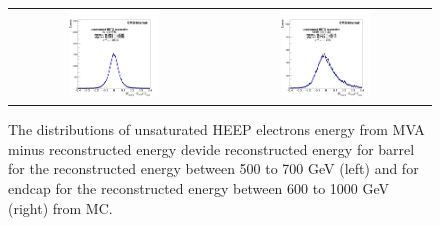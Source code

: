 \begin{figure}[bh]
  \begin{center}
    \begin{tabular}{cc}
      \includegraphics[width=0.45\textwidth]{chapters/Zprime/Saturation/images/ZToEE/ZToEE_B500-700_E600-1000/fit_BDTG_Barrel_Endcap_B_reg_nos.png} &
      \includegraphics[width=0.45\textwidth]{chapters/Zprime/Saturation/images/ZToEE/ZToEE_B500-700_E600-1000/fit_BDTG_Barrel_Endcap_E_reg_nos.png} \\
    \end{tabular}
    \caption{ The distributions of unsaturated HEEP electrons energy from MVA minus reconstructed energy devide reconstructed energy for barrel for the reconstructed energy between 500 to 700 GeV (left) and for endcap for the reconstructed energy between 600 to 1000 GeV (right) from MC.}
    \label{fig:MC_1}
  \end{center}
\end{figure}


